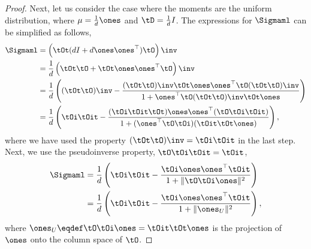 \begin{proof}
Next, let us consider the case where the moments are the uniform
distribution, where $\mu = \frac{1}{d}\ones$ and $\tD = \frac{1}{d} I$.
The expressions for $\Sigmaml$ can be simplified as
follows,
\begin{align*}
    \Sigmaml 
      &= \left( \tOt(d I + d \ones \ones^\top) \tO \right)\inv \\
      &= \frac{1}{d} \left( \tOt\tO + \tOt\ones \ones^\top \tO \right)\inv \\
      &= \frac{1}{d} \left(
      (\tOt\tO)\inv - \frac{(\tOt\tO)\inv \tOt\ones \ones^\top \tO (\tOt\tO)\inv}
        {1 + \ones^\top \tO (\tOt\tO)\inv \tOt\ones} 
        \right)\\
      &= \frac{1}{d} \left(
      \tOi\tOit - \frac{(\tOi\tOit\tOt) \ones \ones^\top (\tO\tOi\tOit)}
        {1+ (\ones^\top \tO \tOi) (\tOit \tOt\ones)} 
        \right),
      \end{align*}
where we have used the property $(\tOt\tO)\inv = \tOi\tOit$ in the last step.
Next, we use the pseudoinverse property, $\tO\tOi\tOit = \tOit$,
      \begin{align*}
    \Sigmaml 
      &= \frac{1}{d} \left(
      \tOi\tOit - \frac{\tOi \ones \ones^\top \tOit}
        {1+ \|\tO \tOi \ones\|^2} 
        \right) \\
      &= \frac{1}{d} \left(
      \tOi\tOit - \frac{\tOi \ones \ones^\top \tOit}
        {1+ \|\ones_U\|^2} 
        \right),
\end{align*}
where $\ones_U \eqdef \tO \tOi \ones = \tOit \tOt \ones$ is the projection of $\ones$ onto
the column space of $\tO$. 


\end{proof}
